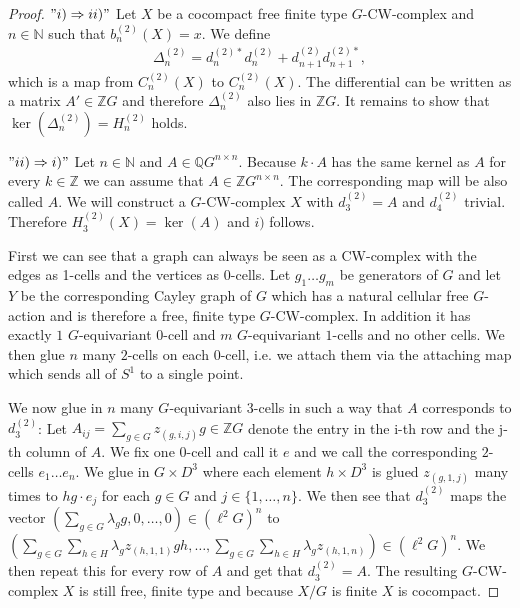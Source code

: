\documentclass[12pt,a4paper]{scrartcl}
\theoremstyle{plain}
\theoremstyle{definition}
\numberwithin{equation}{section}
\newcommand{\Q}{\mathbb{Q}} %
\newcommand{\Z}{\mathbb{Z}} %
\newcommand{\N}{\mathbb{N}} %
\newcommand{\2}{\mathbb{Z} / 2 \mathbb{Z}}
\newcommand{\1}{\bar{1}}
\newcommand{\0}{\bar{0}}
\begin{document}
\begin{proof}
	$"i) \Rightarrow ii)"$ Let $X$ be a cocompact free finite type $G$-CW-complex and $n \in \N$ such that $b_n^{(2)}(X)=x$. We define 
	\begin{align*}
		\Delta_n^{(2)} = d_n^{(2)*} d_n^{(2)} + d_{n+1}^{(2)} d_{n+1}^{(2)*},
	\end{align*}
	which is a map from $C_n^{(2)}(X)$ to $C_n^{(2)}(X)$. The differential can be written as a matrix $A' \in \Z G$ and therefore $\Delta_n^{(2)}$ also lies in $\Z G$. It remains to show that $\ker(\Delta_n^{(2)}) = H_n^{(2)}$ holds. 
	
	$"ii) \Rightarrow i)"$ Let $n \in \N$ and $A\in \Q G^{n \times n}$. Because $k \cdot A$ has the same kernel as $A$ for every $k \in \Z$ we can assume that $A \in \Z G^{n \times n}$. The corresponding map will be also called $A$. We will construct a $G$-CW-complex $X$ with $d_3^{(2)} = A$ and $d_4^{(2)}$ trivial. Therefore $H_3^{(2)}(X) = \ker(A)$ and $i)$ follows.
	
	First we can see that a graph can always be seen as a CW-complex with the edges as 1-cells and the vertices as 0-cells. Let $g_1 \ldots g_m$ be generators of $G$ and let $Y$ be the corresponding Cayley graph of $G$ which has a natural cellular free $G$-action and is therefore a free, finite type $G$-CW-complex. In addition it has exactly $1$ $G$-equivariant $0$-cell and $m$ $G$-equivariant $1$-cells and no other cells. We then glue $n$ many $2$-cells on each $0$-cell, i.e. we attach them via the attaching map which sends all of $S^1$ to a single point. 
	
	We now glue in $n$ many $G$-equivariant $3$-cells in such a way that $A$ corresponds to $d_3^{(2)}$:
	Let $A_{ij} = \sum_{g \in G} z_{(g, i, j)} g \in \Z G$ denote the entry in the i-th row and the j-th column of $A$. We fix one $0$-cell and call it $e$ and we call the corresponding $2$-cells $e_1 \ldots e_n$. We glue in $G \times D^3$ where each element $h \times D^3$ is glued $z_{(g, 1, j)}$ many times to $h g \cdot e_j$ for each $g \in G$ and $j \in \{1, \ldots, n\}$. We then see that $d_3^{(2)}$ maps the vector $(\sum_{g \in G} \lambda_g g, 0 , \ldots , 0) \in (\ell^2 G)^n$ to $(\sum_{g \in G} \sum_{h \in H} \lambda_g z_{(h, 1, 1)} g h, \ldots , \sum_{g \in G} \sum_{h \in H} \lambda_g z_{(h, 1, n)}) \in (\ell^2 G)^n$. We then repeat this for every row of $A$ and get that $d_3^{(2)} = A$. The resulting $G$-CW-complex $X$ is still free, finite type and because $X/G$ is finite $X$ is cocompact.
\end{proof}
\end{document}
